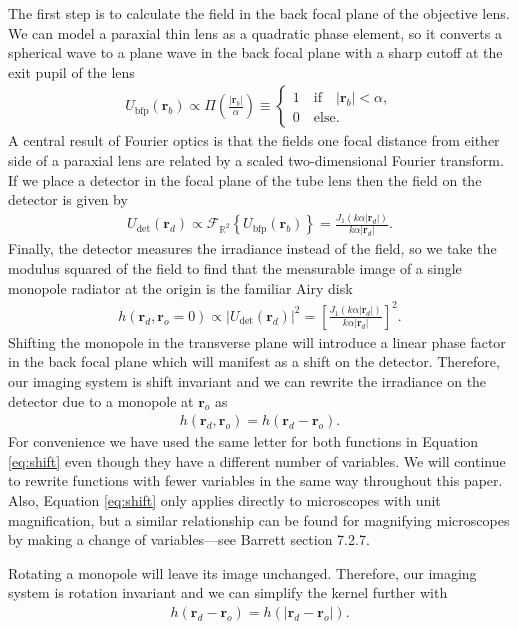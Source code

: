 \documentclass{osa-article}
\providecommand{\mb}[1]{\mathbf{#1}}
\providecommand{\mc}[1]{\mathcal{#1}}
\providecommand{\ro}{\mathbf{\mathbf{r}}_o}
\providecommand{\rd}{\mathbf{r}_d}
\providecommand{\mbb}[1]{\mathbb{#1}}
\begin{document}
The first step is to calculate the field in the back focal plane of the
objective lens. We can model a paraxial thin lens as a quadratic phase element,
so it converts a spherical wave to a plane wave in the back focal plane with a
sharp cutoff at the exit pupil of the lens
\begin{align}
  U_{\text{bfp}}(\mb{r}_b) \propto \Pi\left(\frac{|\mb{r}_b|}{\alpha}\right) \equiv
  \begin{cases}
    1\quad \text{if}\quad |\mb{r}_b| < \alpha,\\
    0\quad \text{else}.
  \end{cases}
\end{align}
A central result of Fourier optics is that the fields one focal distance from
either side of a paraxial lens are related by a scaled two-dimensional Fourier
transform. If we place a detector in the focal plane of the tube lens then the
field on the detector is given by
\begin{align}
  U_{\text{det}}(\mb{r}_d) \propto \mc{F}_{\mbb{R}^2}\left\{U_{\text{bfp}}(\mb{r}_b)\right\} = \frac{J_1(k\alpha|\mb{r}_d|)}{k\alpha|\mb{r}_d|}.
\end{align}
Finally, the detector measures the irradiance instead of the field, so we take
the modulus squared of the field to find that the measurable image of a single
monopole radiator at the origin is the familiar Airy disk
\begin{align}
  h(\mb{r}_d, \ro = 0) \propto |U_{\text{det}}(\mb{r}_d)|^2 = \left[\frac{J_1(k\alpha|\mb{r}_d|)}{k\alpha|\mb{r}_d|}\right]^2.
\end{align}
Shifting the monopole in the transverse plane will introduce a linear phase
factor in the back focal plane which will manifest as a shift on the detector.
Therefore, our imaging system is shift invariant and we can rewrite the
irradiance on the detector due to a monopole at $\ro$ as
\begin{align}
  h(\rd, \ro) = h(\rd - \ro). \label{eq:shift}
\end{align}
For convenience we have used the same letter for both functions in Equation
\ref{eq:shift} even though they have a different number of variables. We will
continue to rewrite functions with fewer variables in the same way throughout
this paper. Also, Equation \ref{eq:shift} only applies directly to microscopes
with unit magnification, but a similar relationship can be found for magnifying
microscopes by making a change of variables---see Barrett section 7.2.7.

Rotating a monopole will leave its image unchanged. Therefore, our imaging
system is rotation invariant and we can simplify the kernel further with
\begin{align}
  h(\rd - \ro) = h(|\rd - \ro|). \label{eq:rotational}
\end{align}
\end{document}
